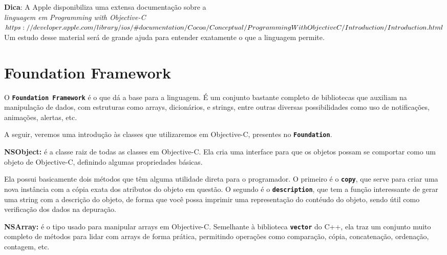 \documentclass[a4paper,12pt,brazil,doubleside]{book}
\begin{document}
\begin{singlespace}
\begin{framed}
\textbf{Dica}: A Apple disponibiliza uma extensa documentação sobre a \textit{\\linguagem em Programming with Objective-C\\ \(https://developer.apple.com/library/ios/\#documentation/Cocoa/Conceptual/\\ProgrammingWithObjectiveC/Introduction/Introduction.html \)\\}
Um estudo desse material será de grande ajuda para entender exatamente o que a linguagem permite.
\end{framed}

\section{Foundation Framework}


O \texttt{\textbf{Foundation Framework}} é o que dá a base para a linguagem. É um conjunto bastante completo de bibliotecas que auxiliam na manipulação de dados, com estruturas como arrays, dicionários, e strings, entre outras diversas possibilidades como uso de notificações, animações, alertas, etc.

A seguir, veremos uma introdução às classes que utilizaremos em Objective-C, presentes no \texttt{\textbf{Foundation}}.

\bigskip

\begin{description}
\item{\textbf{NSObject:} é a classe raiz de todas as classes em Objective-C. Ela cria uma interface para que os objetos possam se comportar como um objeto de Objective-C, definindo algumas propriedades básicas.

Ela possui basicamente dois métodos que têm alguma utilidade direta para o programador. O primeiro é o \texttt{\textbf{copy}}, que serve para criar uma nova instância com a cópia exata dos atributos do objeto em questão. O segundo é o \texttt{\textbf{description}}, que tem a função interessante de gerar uma string com a descrição do objeto, de forma que você possa imprimir uma representação do contéudo do objeto, sendo útil como verificação dos dados na depuração.}

\item{\textbf{NSArray:} é o tipo usado para manipular arrays em Objective-C. Semelhante à biblioteca \texttt{\textbf{vector}} do C++, ela traz um conjunto muito completo de métodos para lidar com arrays de forma prática, permitindo operações como comparação, cópia, concatenação, ordenação, contagem, etc.}


\end{description}
\end{singlespace}
\end{document}
